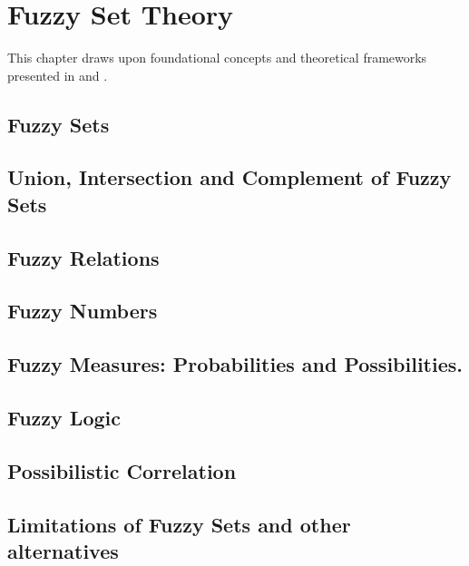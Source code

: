 \chapter{Fuzzy Set Theory}
This chapter draws upon foundational concepts and theoretical frameworks presented in \cite{FULLER1} and \cite{FULLER2}. 

\section{Fuzzy Sets}

\section{Union, Intersection and Complement of Fuzzy Sets}

\section{Fuzzy Relations}

\section{Fuzzy Numbers}\label{sec:fuzzy_numbers}

\section{Fuzzy Measures: Probabilities and Possibilities.}

\section{Fuzzy Logic}\label{sec:fuzzy_logic}


\section{Possibilistic Correlation}
\section{Limitations of Fuzzy Sets and other alternatives}
